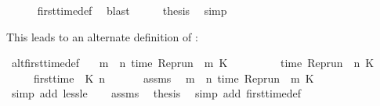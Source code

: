 \begin{isabellebody}
\ \ \ \ \isamarkupfalse%
\ first{\isacharunderscore}time{\isacharunderscore}def\ \isamarkupfalse%
\ blast\isanewline
\ \ \isamarkupfalse%
\ \isamarkupfalse%
\ {\isacharquery}thesis\ \isamarkupfalse%
\ simp\isanewline
{}\isamarkupfalse%
%
\endisatagproof
{\isafoldproof}%
%
\isadelimproof
%
\endisadelimproof
%
\begin{isamarkuptext}%
This leads to an alternate definition of :%
\end{isamarkuptext}\isamarkuptrue%
\isamarkupfalse%
\ alt{\isacharunderscore}first{\isacharunderscore}time{\isacharunderscore}def{\isacharcolon}\isanewline
\ \ \ {\isacartoucheopen}{\isasymforall}m\ {\isacharless}\ n{\isachardot}\ time\ {\isacharparenleft}{\isacharparenleft}Rep{\isacharunderscore}run\ {\isasymrho}{\isacharparenright}\ m\ K{\isacharparenright}\ {\isacharless}\ {\isasymtau}{\isacartoucheclose}\isanewline
\ \ \ \ \ \ \ {\isacartoucheopen}time\ {\isacharparenleft}{\isacharparenleft}Rep{\isacharunderscore}run\ {\isasymrho}{\isacharparenright}\ n\ K{\isacharparenright}\ {\isacharequal}\ {\isasymtau}{\isacartoucheclose}\isanewline
\ \ \ \ \ {\isacartoucheopen}first{\isacharunderscore}time\ {\isasymrho}\ K\ n\ {\isasymtau}{\isacartoucheclose}\isanewline
%
\isadelimproof
%
\endisadelimproof
%
\isatagproof
{}\isamarkupfalse%
\ {\isacharminus}\isanewline
\ \ \isamarkupfalse%
\ assms{\isacharparenleft}{}{\isacharparenright}\ \isamarkupfalse%
\ {\isacartoucheopen}{\isasymforall}m\ {\isacharless}\ n{\isachardot}\ time\ {\isacharparenleft}{\isacharparenleft}Rep{\isacharunderscore}run\ {\isasymrho}{\isacharparenright}\ m\ K{\isacharparenright}\ {\isasymnoteq}\ {\isasymtau}{\isacartoucheclose}\isanewline
\ \ \ \ \isamarkupfalse%
\ {\isacharparenleft}simp\ add{\isacharcolon}\ less{\isacharunderscore}le{\isacharparenright}\isanewline
\ \ \isamarkupfalse%
\ assms{\isacharparenleft}{}{\isacharparenright}\ \isamarkupfalse%
\ {\isacharquery}thesis\ \isamarkupfalse%
\ {\isacharparenleft}simp\ add{\isacharcolon}\ first{\isacharunderscore}time{\isacharunderscore}def{\isacharparenright}\isanewline
{}\isamarkupfalse%
%
\endisatagproof
{\isafoldproof}%
%
\isadelimproof
\isanewline
%
\endisadelimproof
%
\isadelimtheory
\isanewline
%
\endisadelimtheory
%
\isatagtheory
{}\isamarkupfalse%
%
\endisatagtheory
{\isafoldtheory}%
%
\isadelimtheory
%
\endisadelimtheory
%
\end{isabellebody}%
